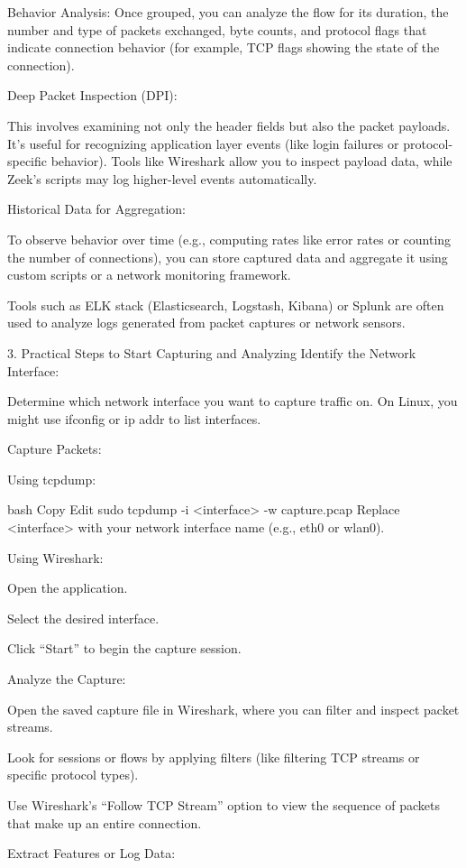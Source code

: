 \documentclass{article}
\begin{document}
Behavior Analysis: Once grouped, you can analyze the flow for its duration, the number and type of packets exchanged, byte counts, and protocol flags that indicate connection behavior (for example, TCP flags showing the state of the connection).

Deep Packet Inspection (DPI):

This involves examining not only the header fields but also the packet payloads. It’s useful for recognizing application layer events (like login failures or protocol-specific behavior). Tools like Wireshark allow you to inspect payload data, while Zeek’s scripts may log higher-level events automatically.

Historical Data for Aggregation:

To observe behavior over time (e.g., computing rates like error rates or counting the number of connections), you can store captured data and aggregate it using custom scripts or a network monitoring framework.

Tools such as ELK stack (Elasticsearch, Logstash, Kibana) or Splunk are often used to analyze logs generated from packet captures or network sensors.

3. Practical Steps to Start Capturing and Analyzing
Identify the Network Interface:

Determine which network interface you want to capture traffic on. On Linux, you might use ifconfig or ip addr to list interfaces.

Capture Packets:

Using tcpdump:

bash
Copy
Edit
sudo tcpdump -i <interface> -w capture.pcap
Replace <interface> with your network interface name (e.g., eth0 or wlan0).

Using Wireshark:

Open the application.

Select the desired interface.

Click “Start” to begin the capture session.

Analyze the Capture:

Open the saved capture file in Wireshark, where you can filter and inspect packet streams.

Look for sessions or flows by applying filters (like filtering TCP streams or specific protocol types).

Use Wireshark’s “Follow TCP Stream” option to view the sequence of packets that make up an entire connection.

Extract Features or Log Data:
\end{document}
